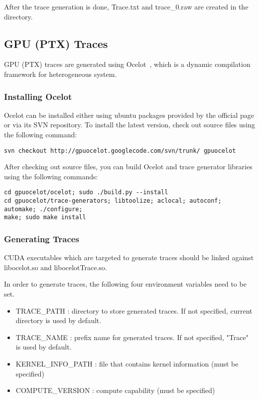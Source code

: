 After the trace generation is done, Trace.txt and trace\_0.raw are created in the directory.

\subsection{GPU (PTX) Traces}

GPU (PTX) traces are generated using Ocelot~\cite{ocelot}, which is a dynamic compilation
framework for heterogeneous system. 

\subsubsection{Installing Ocelot}

Ocelot can be installed either using ubuntu packages provided by the official
page or via its SVN repository. To install the latest version, check out 
source files using the following command:

\smallskip
\begin{lstlisting}
svn checkout http://gpuocelot.googlecode.com/svn/trunk/ gpuocelot
\end{lstlisting}
\smallskip

After checking out source files, you can build Ocelot and trace generator libraries using the following commands:

\smallskip
\begin{lstlisting}
cd gpuocelot/ocelot; sudo ./build.py --install
cd gpuocelot/trace-generators; libtoolize; aclocal; autoconf; automake; ./configure; 
make; sudo make install
\end{lstlisting}
\smallskip

\subsubsection{Generating Traces}

CUDA executables which are targeted to generate traces should be linked against
libocelot.so and libocelotTrace.so.

In order to generate traces, the following four environment variables need to be set.

\begin{itemize}\itemsep2pt
\item TRACE\_PATH : directory to store generated traces. If not specified, current directory is used by default.
\item TRACE\_NAME : prefix name for generated traces. If not specified, "Trace" is used by default.
\item KERNEL\_INFO\_PATH : file that contains kernel information (must be specified)
\item COMPUTE\_VERSION : compute capability (must be specified)
\end{itemize}

